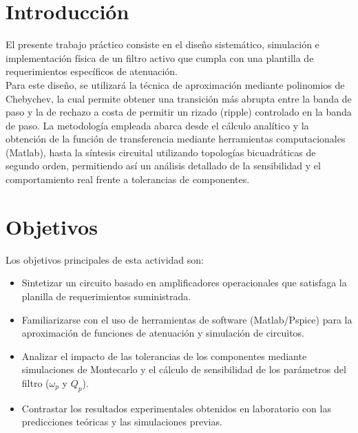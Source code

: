 \section{Introducción}

El presente trabajo práctico consiste en el diseño sistemático, 
simulación e implementación física de un filtro activo que 
cumpla con una plantilla de requerimientos específicos de 
atenuación. \\

Para este diseño, se utilizará la técnica de aproximación 
mediante polinomios de Chebychev, la cual permite obtener una 
transición más abrupta entre la banda de paso y la de rechazo a 
costa de permitir un rizado (ripple) controlado en la banda de 
paso. La metodología empleada abarca desde el cálculo analítico 
y la obtención de la función de transferencia mediante 
herramientas computacionales (Matlab), hasta la síntesis 
circuital utilizando topologías bicuadráticas de segundo orden, 
permitiendo así un análisis detallado de la sensibilidad y el 
comportamiento real frente a tolerancias de componentes.

\newpage
\section{Objetivos}

Los objetivos principales de esta actividad son: 

\begin{itemize}
    \item Sintetizar un circuito basado en amplificadores 
    operacionales que satisfaga la planilla de requerimientos 
    suministrada.
    \item Familiarizarse con el uso de herramientas de software 
    (Matlab/Pspice) para la aproximación de funciones de 
    atenuación y simulación de circuitos.
    \item Analizar el impacto de las tolerancias de los 
    componentes mediante simulaciones de Montecarlo y el cálculo 
    de sensibilidad de los parámetros del filtro ($\omega_p$ y 
    $Q_p$).
    \item Contrastar los resultados experimentales obtenidos en 
    laboratorio con las predicciones teóricas y las simulaciones 
    previas.
\end{itemize}